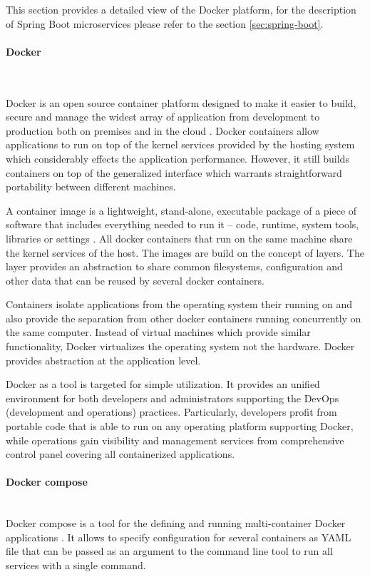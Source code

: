 \documentclass[oneside,
  digital, %
  table,   %
  nolof,     %
  nolot,     %
]{fithesis3}
\newcommand{\newlinepar}[1]{\paragraph{#1}\needspace{4\baselineskip}\mbox{}\\}
\begin{document}
This section provides a detailed view of the Docker platform, for the description of Spring Boot microservices please refer to the section \ref{sec:spring-boot}.

\newlinepar{Docker}
\label{sec:docker}

Docker is an open source container platform designed to make it easier to build, secure and manage the widest array of application from development to production both on premises and in the cloud \cite{docker}. Docker containers allow applications to run on top of the kernel services provided by the hosting system which considerably effects the application performance. However, it still builds containers on top of the generalized interface which warrants straightforward portability between different machines.

A container image is a lightweight, stand-alone, executable package of a piece of software that includes everything needed to run it -- code, runtime, system tools, libraries or settings \cite{docker}. All docker containers that run on the same machine share the kernel services of the host. The images are build on the concept of layers. The layer provides an abstraction to share common filesystems, configuration and other data that can be reused by several docker containers.

Containers isolate applications from the operating system their running on and also provide the separation from other docker containers running concurrently on the same computer. Instead of virtual machines which provide similar functionality, Docker virtualizes the operating system not the hardware. Docker provides abstraction at the application level.

Docker as a tool is targeted for simple utilization. It provides an unified environment for both developers and administrators supporting the DevOps (development and operations) practices. Particularly, developers profit from portable code that is able to run on any operating platform supporting Docker, while operations gain visibility and management services from comprehensive control panel covering all containerized applications.

\newlinepar{Docker compose}

Docker compose is a tool for the defining and running multi-container Docker applications \cite{docker_compose}. It allows to specify configuration for several containers as YAML file that can be passed as an argument to the command line tool to run all services with a single command.
\end{document}
